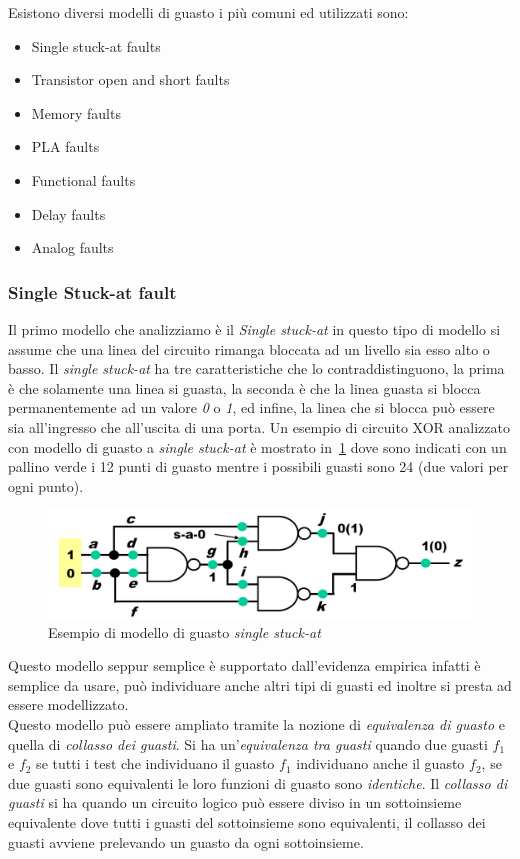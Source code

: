 Esistono diversi modelli di guasto i più comuni ed utilizzati sono:
\begin{itemize}
\item Single stuck-at faults
\item Transistor open and short faults
\item Memory faults
\item PLA faults
\item Functional faults
\item Delay faults
\item Analog faults
\end{itemize}
\subsubsection{Single Stuck-at fault}
Il primo modello che analizziamo è il \emph{Single stuck-at} in questo tipo di modello si assume che una linea del circuito rimanga bloccata ad un livello sia esso alto o basso. Il \emph{single stuck-at} ha tre caratteristiche che lo contraddistinguono, la prima è che solamente una linea si guasta, la seconda è che la linea guasta si blocca permanentemente ad un valore \emph{0} o \emph{1}, ed infine, la linea che si blocca può essere sia all'ingresso che all'uscita di una porta. Un esempio di circuito  XOR analizzato con modello di guasto a \emph{single stuck-at} è mostrato in \figurename\,\ref{fig:xorsinglestuck} dove sono indicati con un pallino verde i 12 punti di guasto mentre i possibili guasti sono 24 (due valori per ogni punto).
\begin{figure}
\centering
\includegraphics[scale=0.4]{img/xorsinglestuck.png}
\caption{Esempio di modello di guasto \emph{single stuck-at}}\label{fig:xorsinglestuck}
\end{figure}
Questo modello seppur semplice è supportato dall'evidenza empirica infatti è semplice da usare, può individuare anche altri tipi di guasti ed inoltre si presta ad essere modellizzato.\\
Questo modello può essere ampliato tramite la nozione di \emph{equivalenza di guasto} e quella di \emph{collasso dei guasti}. Si ha un'\emph{equivalenza tra guasti} quando due guasti $f_1$ e $f_2$ se tutti i test che individuano il guasto $f_1$ individuano anche il guasto $f_2$, se due guasti sono equivalenti le loro funzioni di guasto sono \emph{identiche}. Il \emph{collasso di guasti} si ha quando un circuito logico può essere diviso in un sottoinsieme equivalente dove tutti i guasti del sottoinsieme sono equivalenti, il collasso dei guasti avviene prelevando un guasto da ogni sottoinsieme.
